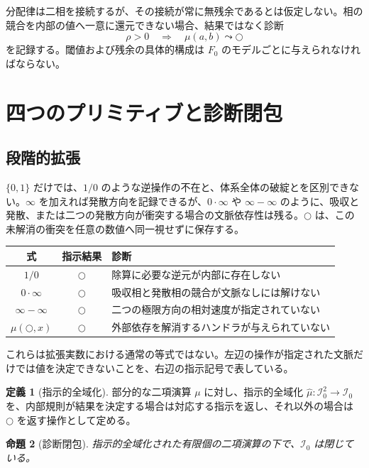 \documentclass[a4paper,11pt]{ltjsarticle}
\theoremstyle{definition}
\newtheorem{definition}{定義}[section]
\theoremstyle{plain}
\newtheorem{proposition}[definition]{命題}
\newcommand{\dfix}{\bigcirc}
\newcommand{\Fzero}{F_{0}}
\begin{document}
分配律は二相を接続するが、その接続が常に無残余であるとは仮定しない。相の競合を内部の値へ一意に還元できない場合、結果ではなく診断
\[
 \rho>0\quad\Longrightarrow\quad\mu(a,b)\leadsto\dfix
\]
を記録する。閾値および残余の具体的構成は $\Fzero$ のモデルごとに与えられなければならない。

\section{四つのプリミティブと診断閉包}

\subsection{段階的拡張}

$\{0,1\}$ だけでは、$1/0$ のような逆操作の不在と、体系全体の破綻とを区別できない。$\infty$ を加えれば発散方向を記録できるが、$0\cdot\infty$ や $\infty-\infty$ のように、吸収と発散、または二つの発散方向が衝突する場合の文脈依存性は残る。$\dfix$ は、この未解消の衝突を任意の数値へ同一視せずに保存する。

\begin{center}
\begin{tabular}{c c p{}}
\toprule
式 & 指示結果 & 診断 \\
\midrule
$1/0$ & $\dfix$ & 除算に必要な逆元が内部に存在しない \\
$0\cdot\infty$ & $\dfix$ & 吸収相と発散相の競合が文脈なしには解けない \\
$\infty-\infty$ & $\dfix$ & 二つの極限方向の相対速度が指定されていない \\
$\mu(\dfix,x)$ & $\dfix$ & 外部依存を解消するハンドラが与えられていない \\
\bottomrule
\end{tabular}
\end{center}

これらは拡張実数における通常の等式ではない。左辺の操作が指定された文脈だけでは値を決定できないことを、右辺の指示記号で表している。

\begin{definition}[指示的全域化]
部分的な二項演算 $\mu$ に対し、指示的全域化 $\widehat{\mu}:\mathcal{I}_0^2\to\mathcal{I}_0$ を、内部規則が結果を決定する場合は対応する指示を返し、それ以外の場合は $\dfix$ を返す操作として定める。
\end{definition}

\begin{proposition}[診断閉包]
指示的全域化された有限個の二項演算の下で、$\mathcal{I}_0$ は閉じている。
\end{proposition}
\end{document}
